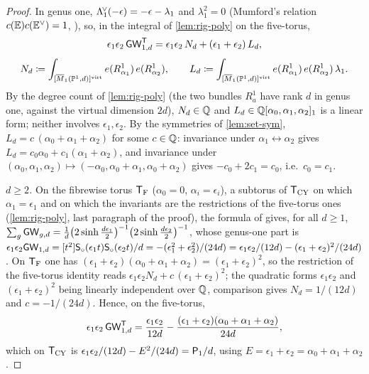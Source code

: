 \begin{proof}
In genus one, $\Lambda^{\!\vee}_1(-\epsilon)=-\epsilon-\lambda_1$ and $\lambda_1^2=0$ (Mumford's relation $c(\mathbb{E})c(\mathbb{E}^\vee)=1$, \cite{Mum83}), so, in the integral of \cref{lem:rig-poly} on the five-torus,
\[
\epsilon_1\epsilon_2\,\mathsf{GW}^{\mathsf{T}}_{1,d}=\epsilon_1\epsilon_2\,N_d+(\epsilon_1+\epsilon_2)\,L_d,
\]
\[
N_d\coloneqq\int_{[\overline{M}_1(\mathbb{P}^1,d)]^{\mathrm{virt}}}e(R^1_{\alpha_1})\,e(R^1_{\alpha_2}),\qquad
L_d\coloneqq\int_{[\overline{M}_1(\mathbb{P}^1,d)]^{\mathrm{virt}}}e(R^1_{\alpha_1})\,e(R^1_{\alpha_2})\,\lambda_1 .
\]
By the degree count of \cref{lem:rig-poly} (the two bundles $R^1_a$ have rank $d$ in genus one, against the virtual dimension $2d$), $N_d\in\mathbb{Q}$ and $L_d\in\mathbb{Q}[\alpha_0,\alpha_1,\alpha_2]_1$ is a linear form; neither involves $\epsilon_1,\epsilon_2$. By the symmetries of \cref{lem:set-sym}, $L_d=c\,(\alpha_0+\alpha_1+\alpha_2)$ for some $c\in\mathbb{Q}$: invariance under $\alpha_1\leftrightarrow\alpha_2$ gives $L_d=c_0\alpha_0+c_1(\alpha_1+\alpha_2)$, and invariance under $(\alpha_0,\alpha_1,\alpha_2)\mapsto(-\alpha_0,\alpha_0+\alpha_1,\alpha_0+\alpha_2)$ gives $-c_0+2c_1=c_0$, i.e.\ $c_0=c_1$.

\emph{$d\geq 2$.} On the fibrewise torus $\mathsf{T}_{\mathrm{F}}$ ($\alpha_0=0$, $\alpha_i=\epsilon_i$), a subtorus of $\mathsf{T}_{\mathrm{CY}}$ on which $\alpha_1=\epsilon_1$ and on which the invariants are the restrictions of the five-torus ones (\cref{lem:rig-poly}, last paragraph of the proof), the formula of \cite{BS} gives, for all $d\geq 1$, $\sum_g\mathsf{GW}_{g,d}=\frac{1}{d}\big(2\sinh\frac{d\epsilon_1}{2}\big)^{-1}\big(2\sinh\frac{d\epsilon_2}{2}\big)^{-1}$, whose genus-one part is $\epsilon_1\epsilon_2\mathsf{GW}_{1,d}=[t^2]\mathsf{S}_{\circ}(\epsilon_1t)\mathsf{S}_{\circ}(\epsilon_2t)/d=-(\epsilon_1^2+\epsilon_2^2)/(24d)=\epsilon_1\epsilon_2/(12d)-(\epsilon_1+\epsilon_2)^2/(24d)$. On $\mathsf{T}_{\mathrm{F}}$ one has $(\epsilon_1+\epsilon_2)(\alpha_0+\alpha_1+\alpha_2)=(\epsilon_1+\epsilon_2)^2$, so the restriction of the five-torus identity reads $\epsilon_1\epsilon_2N_d+c\,(\epsilon_1+\epsilon_2)^2$; the quadratic forms $\epsilon_1\epsilon_2$ and $(\epsilon_1+\epsilon_2)^2$ being linearly independent over $\mathbb{Q}$, comparison gives $N_d=1/(12d)$ and $c=-1/(24d)$. Hence, on the five-torus,
\[
\epsilon_1\epsilon_2\,\mathsf{GW}^{\mathsf{T}}_{1,d}=\frac{\epsilon_1\epsilon_2}{12d}-\frac{(\epsilon_1+\epsilon_2)(\alpha_0+\alpha_1+\alpha_2)}{24d},
\]
which on $\mathsf{T}_{\mathrm{CY}}$ is $\epsilon_1\epsilon_2/(12d)-E^2/(24d)=\mathsf{P}_{1}/d$, using $E=\epsilon_1+\epsilon_2=\alpha_0+\alpha_1+\alpha_2$.


\end{proof}
